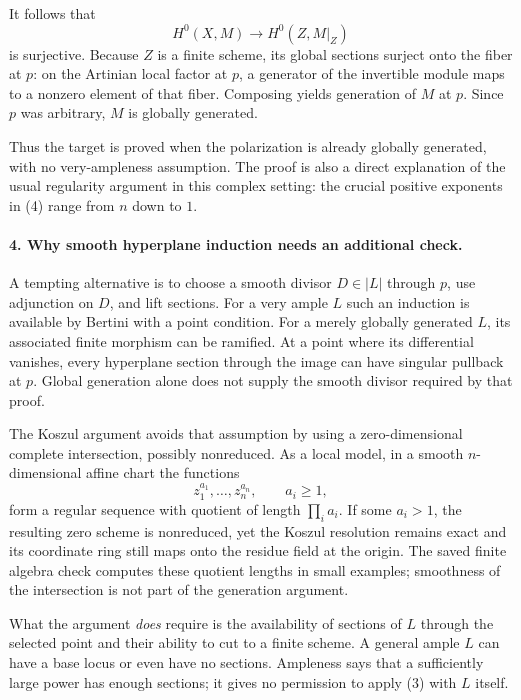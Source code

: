 \documentclass[11pt]{article}
\begin{document}
It follows that
\[
 H^0(X,M)\longrightarrow H^0(Z,M|_Z)
\]
is surjective. Because $Z$ is a finite scheme, its global sections surject onto the fiber at $p$: on the Artinian local factor at $p$, a generator of the invertible module maps to a nonzero element of that fiber. Composing yields generation of $M$ at $p$. Since $p$ was arbitrary, $M$ is globally generated.

Thus the target is proved when the polarization is already globally generated, with no very-ampleness assumption. The proof is also a direct explanation of the usual regularity argument in this complex setting: the crucial positive exponents in (4) range from $n$ down to $1$.

\paragraph{4. Why smooth hyperplane induction needs an additional check.}
A tempting alternative is to choose a smooth divisor $D\in|L|$ through $p$, use adjunction on $D$, and lift sections. For a very ample $L$ such an induction is available by Bertini with a point condition. For a merely globally generated $L$, its associated finite morphism can be ramified. At a point where its differential vanishes, every hyperplane section through the image can have singular pullback at $p$. Global generation alone does not supply the smooth divisor required by that proof.

The Koszul argument avoids that assumption by using a zero-dimensional complete intersection, possibly nonreduced. As a local model, in a smooth $n$-dimensional affine chart the functions
\[
 z_1^{a_1},\ldots,z_n^{a_n},\qquad a_i\ge1,
\]
form a regular sequence with quotient of length $\prod_i a_i$. If some $a_i>1$, the resulting zero scheme is nonreduced, yet the Koszul resolution remains exact and its coordinate ring still maps onto the residue field at the origin. The saved finite algebra check computes these quotient lengths in small examples; smoothness of the intersection is not part of the generation argument.

What the argument \emph{does} require is the availability of sections of $L$ through the selected point and their ability to cut to a finite scheme. A general ample $L$ can have a base locus or even have no sections. Ampleness says that a sufficiently large power has enough sections; it gives no permission to apply (3) with $L$ itself.
\end{document}
